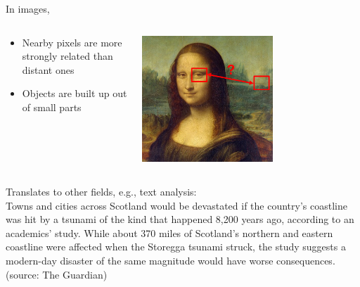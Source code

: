 \documentclass[usenames,dvipsnames]{beamer}
\begin{document}
    \begin{frame}{\secname}{\subsecname}
        In images,
        \begin{columns}
            \begin{column}{0.5\textwidth}
               \begin{itemize}
                   \item Nearby pixels are more strongly related than distant ones
                   \item Objects are built up out of small parts
               \end{itemize}
            \end{column}
            \begin{column}{0.5\textwidth}
                \begin{center}
                 \includegraphics[width=0.6\textwidth]{figures/DL_fundamentals/mona_lisa.png}
                 \end{center}
            \end{column}
        \end{columns}
        \vspace{1em}
        Translates to other fields, e.g., text analysis:\\ 
        {\tiny Towns and {\color{orange}cities} across {\color{orange}Scotland} would be devastated if the country’s coastline was hit by a tsunami of the kind that happened 8,200 years ago, according to an academics’ study.
        While about 370 miles of Scotland’s northern and eastern coastline were affected when the Storegga tsunami struck, the study suggests a modern-day disaster of the same {\color{ForestGreen}magnitude} would have worse consequences. (source: The Guardian)}
    \end{frame}
\end{document}
